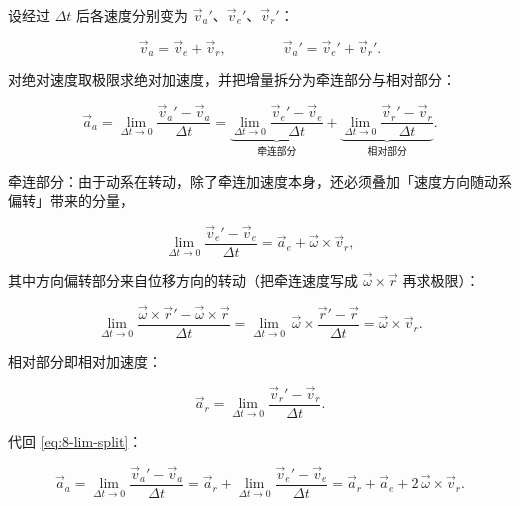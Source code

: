 设经过 $\Delta t$ 后各速度分别变为 $\vec v_a'$、$\vec v_e'$、$\vec v_r'$：

\begin{equation}\label{eq:8-lim-vsum}
  \vec v_a = \vec v_e + \vec v_r,
  \qquad\qquad
  \vec v_a' = \vec v_e' + \vec v_r' .
\end{equation}

对绝对速度取极限求绝对加速度，并把增量拆分为牵连部分与相对部分：

\begin{equation}\label{eq:8-lim-split}
  \vec a_a = \lim_{\Delta t \to 0}\frac{\vec v_a' - \vec v_a}{\Delta t}
           = \underbrace{\lim_{\Delta t \to 0}\frac{\vec v_e' - \vec v_e}{\Delta t}}_{\text{牵连部分}}
           + \underbrace{\lim_{\Delta t \to 0}\frac{\vec v_r' - \vec v_r}{\Delta t}}_{\text{相对部分}} .
\end{equation}

牵连部分：由于动系在转动，除了牵连加速度本身，还必须叠加「速度方向随动系偏转」带来的分量，

\begin{equation}\label{eq:8-ae-extra}
  \lim_{\Delta t \to 0}\frac{\vec v_e' - \vec v_e}{\Delta t}
  = \vec a_e + \vec\omega\times\vec v_r ,
\end{equation}

其中方向偏转部分来自位移方向的转动（把牵连速度写成 $\vec\omega\times\vec r$ 再求极限）：

\begin{equation}\label{eq:8-rot-term}
  \lim_{\Delta t \to 0}\frac{\vec\omega\times\vec r' - \vec\omega\times\vec r}{\Delta t}
  = \lim_{\Delta t \to 0}\,\vec\omega\times\frac{\vec r' - \vec r}{\Delta t}
  = \vec\omega\times\vec v_r .
\end{equation}

相对部分即相对加速度：

\begin{equation}\label{eq:8-ar-def}
  \vec a_r = \lim_{\Delta t \to 0}\frac{\vec v_r' - \vec v_r}{\Delta t} .
\end{equation}

代回 \eqref{eq:8-lim-split}：

\begin{equation}\label{eq:8-lim-final}
  \vec a_a = \lim_{\Delta t \to 0}\frac{\vec v_a' - \vec v_a}{\Delta t}
           = \vec a_r + \lim_{\Delta t \to 0}\frac{\vec v_e' - \vec v_e}{\Delta t}
           = \vec a_r + \vec a_e + 2\,\vec\omega\times\vec v_r .
\end{equation}

